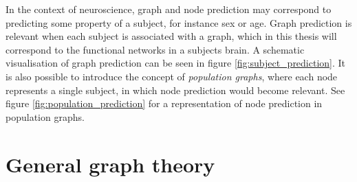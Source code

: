 In the context of neuroscience, graph and node prediction may correspond to predicting some property of a subject, for instance sex or age. Graph prediction is relevant when each subject is associated with a graph, which in this thesis will correspond to the functional networks in a subjects brain. A schematic visualisation of graph prediction can be seen in figure \ref{fig:subject_prediction}. It is also possible to introduce the concept of \textit{population graphs}, where each node represents a single subject, in which node prediction would become relevant. See figure \ref{fig:population_prediction} for a representation of node prediction in population graphs. 








\section{General graph theory}
\label{sec:general_graph_theory}

